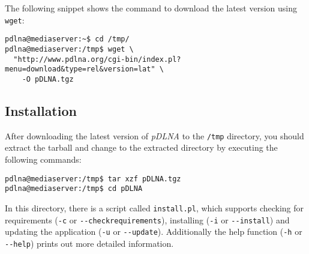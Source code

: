 The following snippet shows the command to download the latest version using \verb|wget|:
\begin{lstlisting}
pdlna@mediaserver:~$ cd /tmp/
pdlna@mediaserver:/tmp$ wget \
  "http://www.pdlna.org/cgi-bin/index.pl?menu=download&type=rel&version=lat" \
	-O pDLNA.tgz
\end{lstlisting}

\subsection{Installation}
\label{install-unix-latest-release-installation}

After downloading the latest version of {\em pDLNA} to the \verb|/tmp| directory, you should extract the tarball and change to the extracted directory by executing the following commands:
\begin{lstlisting}
pdlna@mediaserver:/tmp$ tar xzf pDLNA.tgz
pdlna@mediaserver:/tmp$ cd pDLNA
\end{lstlisting}

In this directory, there is a script called \verb|install.pl|, which supports checking for requirements (\verb|-c| or \verb|--checkrequirements|), installing (\verb|-i| or \verb|--install|) and updating the application (\verb|-u| or \verb|--update|). Additionally the help function (\verb|-h| or \verb|--help|) prints out more detailed information.

